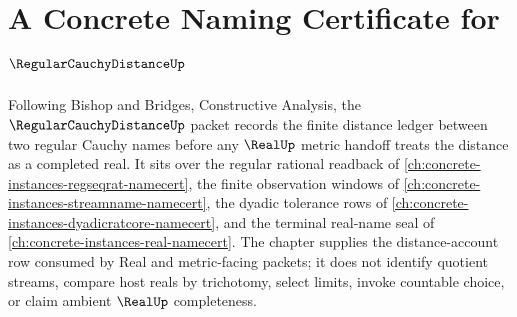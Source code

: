 \chapter{A Concrete Naming Certificate for $\RegularCauchyDistanceUp$}
\label{ch:concrete-instances-regular-cauchy-distance-namecert}

Following Bishop and Bridges, Constructive Analysis, the $\RegularCauchyDistanceUp$ packet records the finite distance ledger between two regular Cauchy names before any $\RealUp$ metric handoff treats the distance as a completed real. It sits over the regular rational readback of \autoref{ch:concrete-instances-regseqrat-namecert}, the finite observation windows of \autoref{ch:concrete-instances-streamname-namecert}, the dyadic tolerance rows of \autoref{ch:concrete-instances-dyadicratcore-namecert}, and the terminal real-name seal of \autoref{ch:concrete-instances-real-namecert}. The chapter supplies the distance-account row consumed by Real and metric-facing packets; it does not identify quotient streams, compare host reals by trichotomy, select limits, invoke countable choice, or claim ambient $\RealUp$ completeness.

